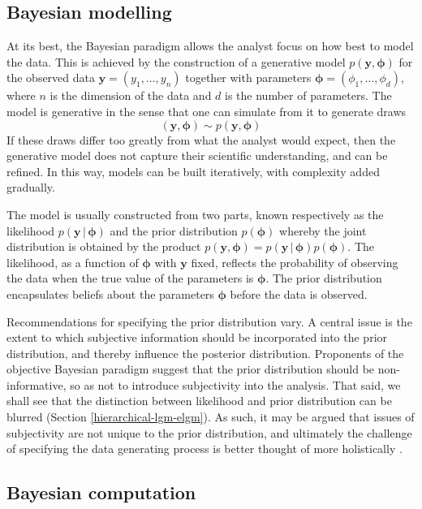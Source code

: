 \documentclass[a4paper, nobind]{templates/ociamthesis}
\newcommand{\y}{\mathbf{y}}
\newcommand{\bphi}{\bm{\phi}}
\begin{document}
\hypertarget{bayesian-modelling}{%
\subsection{Bayesian modelling}\label{bayesian-modelling}}

At its best, the Bayesian paradigm allows the analyst focus on how best to model the data.
This is achieved by the construction of a generative model \(p(\y, \bphi)\) for the observed data \(\y = (y_1, \ldots, y_n)\) together with parameters \(\bphi = (\phi_1, \ldots, \phi_d)\), where \(n\) is the dimension of the data and \(d\) is the number of parameters.
The model is generative in the sense that one can simulate from it to generate draws
\begin{equation}
(\y, \bphi) \sim p(\y, \bphi)
\end{equation}
If these draws differ too greatly from what the analyst would expect, then the generative model does not capture their scientific understanding, and can be refined.
In this way, models can be built iteratively, with complexity added gradually.

The model is usually constructed from two parts, known respectively as the likelihood \(p(\y \, | \, \bphi)\) and the prior distribution \(p(\bphi)\) whereby the joint distribution is obtained by the product \(p(\y, \bphi) = p(\y \, | \, \bphi) p(\bphi)\).
The likelihood, as a function of \(\bphi\) with \(\y\) fixed, reflects the probability of observing the data when the true value of the parameters is \(\bphi\).
The prior distribution encapsulates beliefs about the parameters \(\bphi\) before the data is observed.

Recommendations for specifying the prior distribution vary.
A central issue is the extent to which subjective information should be incorporated into the prior distribution, and thereby influence the posterior distribution.
Proponents of the objective Bayesian paradigm suggest that the prior distribution should be non-informative, so as not to introduce subjectivity into the analysis.
That said, we shall see that the distinction between likelihood and prior distribution can be blurred (Section \ref{hierarchical-lgm-elgm}).
As such, it may be argued that issues of subjectivity are not unique to the prior distribution, and ultimately the challenge of specifying the data generating process is better thought of more holistically \autocite{gelman2017prior}.

\hypertarget{bayesian-computation}{%
\subsection{Bayesian computation}\label{bayesian-computation}}
\end{document}
